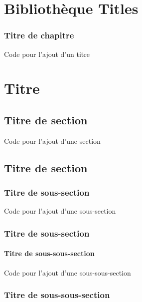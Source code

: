 \chapter{Bibliothèque Titles}

\subsection{Titre de chapitre}
\begin{Latex}{Code pour l'ajout d'un titre}
  \chapter{Titre}
\end{Latex}

\section{Titre de section}
\begin{Latex}{Code pour l'ajout d'une section}
  \section{Titre de section}
\end{Latex}

\subsection{Titre de sous-section}

\begin{Latex}{Code pour l'ajout d'une sous-section}
  \subsection{Titre de sous-section}
\end{Latex}

\subsubsection{Titre de sous-sous-section}
\begin{Latex}{Code pour l'ajout d'une sous-sous-section}
  \subsection{Titre de sous-sous-section}
\end{Latex}
